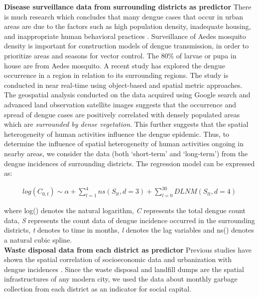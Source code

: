 \documentclass{bmcart}
\begin{document}
\textbf{Disease surveillance data from surrounding districts as predictor} There is much research which concludes that many dengue cases that occur in urban areas are due to the factors such as high population density, inadequate housing, and inappropriate human behavioral practices \cite{chang2009combining,knudsen1992vector,troyo2009urban}.  Surveillance of Aedes mosquito density is important for construction models of dengue transmission, in order to prioritize areas and seasons for vector control. The 80\% of larvae or pupa in house are from Aedes mosquito. A recent study \cite{sarfraz2014near} has explored the dengue occurrence in a region in relation to its surrounding regions. The study is conducted in near real-time using object-based and spatial metric approaches. The geospatial analysis conducted on the data acquired using Google search and advanced land observation satellite images suggests that the occurrence and spread of dengue cases are positively correlated with densely populated areas which are \textit{surrounded by dense vegetation}. This further suggests that the spatial heterogeneity of human activities influence the dengue epidemic. Thus, to determine the influence of spatial heterogeneity of human activities ongoing in nearby areas, we consider the data (both `short-term' and `long-term') from the dengue incidences of surrounding districts. The regression model can be expressed as:

\begin{equation}
\begin{aligned}
\label{eq:surrounding}
log (C_{0,t}) \sim \alpha  +  \sum_{l=1}^{4} ns(S_ {lt}, d =3) + \sum_{l=0}^{30} DLNM(S_ {lt}, d = 4) 
\end{aligned}
\end{equation}


where log() denotes the natural logarithm, \textit{C} represents the total dengue count data, \textit{S} represents the count data of dengue incidence occurred in the surrounding districts, \textit{t} denotes to time in months, \textit{l} denotes the lag variables and ns() denotes a natural cubic spline. \\

\textbf{Waste disposal data from each district as predictor} Previous studies have shown the spatial correlation of socioeconomic data and urbanization with dengue incidences \cite{mondini2008spatial,wu2009higher}. Since the waste disposal and landfill dumps are the spatial infrastructures of any modern city, we used the data about monthly garbage collection from each district as an indicator for social capital. 
\end{document}

